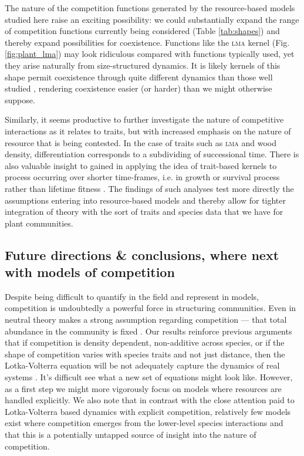 \documentclass[a4paper,11pt]{article}
\begin{document}
The nature of the competition functions generated by the
resource-based models studied here raise an exciting possibility: we
could substantially expand the range of competition functions
currently being considered (Table \ref{tab:shapes}) and thereby expand
possibilities for coexistence. Functions like the \textsc {lma} kernel
(Fig. \ref{fig:plant_lma}) may look ridiculous compared with functions
typically used, yet they arise naturally from size-structured
dynamics.  It is likely kernels of this shape permit coexistence
through quite different dynamics than those well studied
\citep[e.g.][]{Leimar-2013}, rendering coexistence easier (or harder)
than we might otherwise suppose.

Similarly, it seems productive to further investigate the nature of
competitive interactions as it relates to traits, but with increased
emphasis on the nature of resource that is being contested. In the
case of traits such as \textsc{lma} and wood density, differentiation
corresponds to a subdividing of successional time. There is also
valuable insight to gained in applying the idea of trait-based kernels
to process occurring over shorter time-frames, i.e. in growth or
survival process rather than lifetime fitness
\citep[e.g.][]{Kunstler-2012, Lasky-2015}.  The findings of such
analyses test more directly the assumptions entering into
resource-based models and thereby allow for tighter integration of
theory with the sort of traits and species data that we have for plant
communities.

\subsection{Future directions \& conclusions, where next with models of
competition}

Despite being difficult to quantify in the field and represent in
models, competition is undoubtedly a powerful force in structuring
communities.
Even in neutral theory makes a
strong assumption regarding competition --- that total abundance in
the community is fixed \citep{Hubbell-2001}.
%
Our results reinforce previous arguments that if competition is
density dependent, non-additive across species, or if the shape of
competition varies with species traits and not just distance, then the
Lotka-Volterra equation will be not adequately capture the dynamics of
real systems \citep{Andrewartha-1953, Neill-1974, Abrams-1975,
  Wangersky-1978,Abrams-1980, Tilman-1987}.  It's difficult see what a
new set of equations might look like.  However, as a first step we
might more vigorously focus on models where resources are handled
explicitly.  We also note that in contrast with the close attention
paid to Lotka-Volterra based dynamics with explicit competition,
relatively few models exist where competition emerges from the
lower-level species interactions and that this is a potentially
untapped source of insight into the nature of competition.
\end{document}
